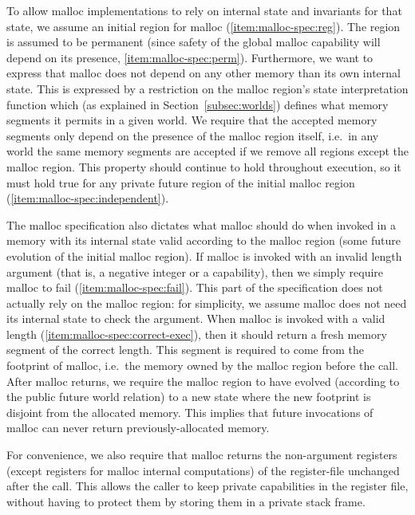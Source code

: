 \documentclass[format=acmsmall, review=true, screen=true]{acmart}
\renewcommand{\sectionname}{Section}
\newenvironment{toplas}{}{}
\begin{document}
\begin{toplas}
To allow malloc implementations to rely on internal state and invariants for
that state, we assume an initial region for malloc (\ref{item:malloc-spec:reg}). The region is assumed to be
permanent (since safety of the global malloc capability will depend on its
presence, \ref{item:malloc-spec:perm}).
Furthermore, we want to express that malloc does not depend on any other memory
than its own internal state. This is expressed by a restriction on the malloc
region's state interpretation function which (as explained in
\sectionname~\ref{subsec:worlds}) defines what memory segments it permits in a
given world. We require that the accepted memory segments only depend on the
presence of the malloc region itself, i.e.\ in any world the same memory
segments are accepted if we remove all regions except the malloc region. This
property should continue to hold throughout execution, so it must hold true for
any private future region of the initial malloc region (\ref{item:malloc-spec:independent}).

The malloc specification also dictates what malloc should do when invoked in a
memory with its internal state valid according to the malloc region (some future
evolution of the initial malloc region). If malloc is invoked with an invalid
length argument (that is, a negative integer or a capability), then we simply
require malloc to fail (\ref{item:malloc-spec:fail}). This part of the
specification does not actually rely on the malloc region: for simplicity, we
assume malloc does not need its internal state to check the argument. When
malloc is invoked with a valid length (\ref{item:malloc-spec:correct-exec}),
then it should return a fresh memory segment of the correct length. This segment
is required to come from the footprint of malloc, i.e.\ the memory owned by the
malloc region before the call. After malloc returns, we require the malloc
region to have evolved (according to the public future world relation) to a new
state where the new footprint is disjoint from the allocated memory. This
implies that future invocations of malloc can never return previously-allocated
memory.

For convenience, we also require that malloc returns the non-argument registers (except registers for malloc internal computations) of the register-file unchanged after the call.
This allows the caller to keep private capabilities in the register file, without having to protect them by storing them in a private stack frame.


\end{toplas}
\end{document}

